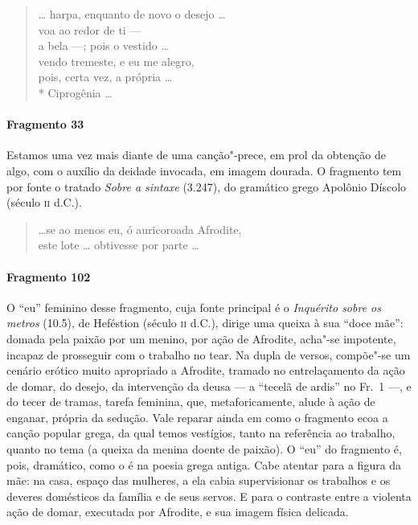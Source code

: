 \begin{verse}
\ldots{} harpa, enquanto de novo o desejo \ldots{}\\
voa ao redor de ti ---\\
a bela ---; pois o vestido \ldots{}\\
vendo tremeste, e eu me alegro,\\
pois, certa vez, a própria \ldots{} \\*
Ciprogênia \ldots{}
\end{verse}

\paragraph{Fragmento 33}

{\small Estamos uma vez mais diante de uma canção"-prece, em prol da obtenção de algo,
com o auxílio da deidade invocada, em imagem dourada. O fragmento tem por fonte
o tratado \textit{Sobre a sintaxe} (3.247), do gramático grego Apolônio Díscolo (século
\textsc{ii} d.C.).}

\begin{verse}
\ldots{}se ao menos eu, ó auricoroada Afrodite,\\
este lote \ldots{} obtivesse por parte \ldots{}
\end{verse}

\paragraph{Fragmento 102}

{\small O “eu” feminino desse fragmento, cuja fonte principal é o \textit{Inquérito
sobre os metros} (10.5), de Heféstion (século \textsc{ii} d.C.), dirige uma queixa à sua
“doce mãe”: domada pela paixão por um menino, por ação de Afrodite,
acha"-se impotente, incapaz de prosseguir com o trabalho no tear. Na dupla de
versos, compõe"-se um cenário erótico muito apropriado a Afrodite, tramado no
entrelaçamento da ação de domar, do desejo, da intervenção da deusa
--- a ``tecelã de ardis” no Fr.~1 ---, e do tecer de tramas, tarefa
feminina, que, metaforicamente, alude à ação de enganar, própria da sedução.
Vale reparar ainda em como o fragmento ecoa a canção popular grega, da qual
temos vestígios, tanto na referência ao trabalho, quanto no tema (a queixa da
menina doente de paixão). O “eu” do fragmento é, pois, dramático, como o é
na poesia grega antiga. Cabe atentar para a figura da mãe: na
casa, espaço das mulheres, a ela cabia supervisionar os trabalhos e os deveres
domésticos da família e de seus servos. E para o contraste entre a violenta
ação de domar, executada por Afrodite, e sua imagem física delicada.}

